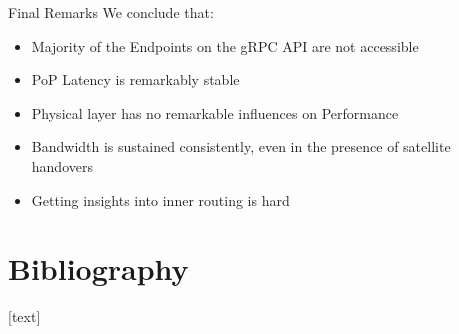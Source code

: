 \documentclass[NET,english,beameralt]{tumbeamer}
\begin{document}
\begin{frame}[fragile]{Final Remarks}
    We conclude that:
    \begin{itemize}
        \item Majority of the Endpoints on the gRPC API are not accessible
        \item PoP Latency is remarkably stable
        \item Physical layer has no remarkable influences on Performance
        \item Bandwidth is sustained consistently, even in the presence of satellite handovers
        \item Getting insights into inner routing is hard
    \end{itemize}
\end{frame}


\section{Bibliography}
\begin{frame}[allowframebreaks]
    
    [text]
    \footnotesize
    
\end{frame}
\end{document}
